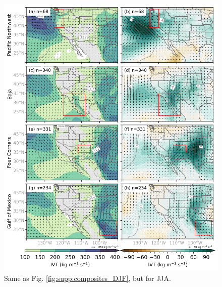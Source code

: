 \documentclass[jgrga]{agutexSI2019}
\begin{document}
\begin{article}
\begin{figure}
\noindent\includegraphics[scale=0.8]{figS9.png}
\caption{Same as Fig. \ref{fig:supp:composites_DJF}, but for JJA.}
\label{fig:supp:composites_JJA}
\end{figure}
\clearpage


\end{article}
\end{document}
